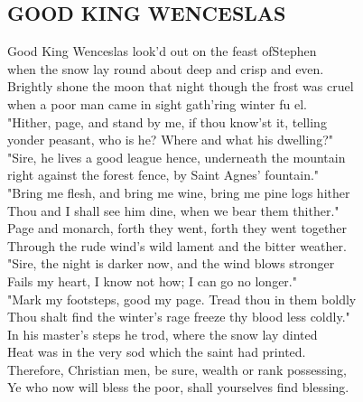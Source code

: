 \begin{flushleft}
	\section*{\Huge GOOD KING WENCESLAS}
\end{flushleft}

Good King Wenceslas look'd out on the  feast ofStephen\\
when the snow lay round about deep and crisp and even.\\
Brightly shone the   moon that night though the frost was  cruel\\
when a poor man came in sight gath'ring winter fu \hspace{0,5cm} el.\\

"Hither, page, and stand by me, if thou know'st it, telling\\
yonder peasant, who is he? Where and what his dwelling?"\\
"Sire, he lives a good league hence, underneath the mountain\\
right against the forest fence, by Saint Agnes' fountain."\\

"Bring me flesh, and bring me wine, bring me pine logs hither\\
Thou and I shall see him dine, when we bear them thither."\\
Page and monarch, forth they went, forth they went together\\
Through the rude wind's wild lament and the bitter weather.\\

"Sire, the night is darker now, and the wind blows stronger\\
Fails my heart, I know not how; I can go no longer."\\
"Mark my footsteps, good my page. Tread thou in them boldly\\
Thou shalt find the winter's rage freeze thy blood less coldly."\\

In his master's steps he trod, where the snow lay dinted\\
Heat was in the very sod which the saint had printed.\\
Therefore, Christian men, be sure, wealth or rank possessing,\\
Ye who now will bless the poor, shall yourselves find blessing.

\newpage
